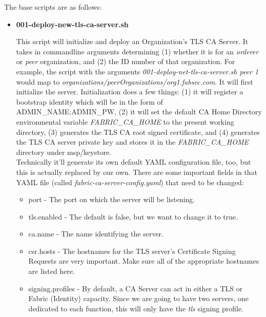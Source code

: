 			The base scripts are as follows:
			\begin{itemize}
				\item \textbf{001-deploy-new-tls-ca-server.sh}
				
					\hspace{10mm}This script will initialize and deploy an Organization's TLS CA Server. It takes in commandline arguments determining (1) whether it is for an \textit{orderer} or \textit{peer} organization, and (2) the ID number of that organization. For example, the script with the arguments \textit{001-deploy-net-tls-ca-server.sh peer 1} would map to \textit{organizations/peerOrganizations/org1.fabsec.com}. It will first initialize the server. Initialization does a few things: (1) it will register a bootstrap identity which will be in the form of ADMIN\_NAME:ADMIN\_PW, (2) it will set the default CA Home Directory environmental variable \textit{FABRIC\_CA\_HOME} to the present working directory, (3) generates the TLS CA root signed certificate, and (4) generates the TLS CA server private key and stores it in the \textit{FABRIC\_CA\_HOME} directory under msp/keystore.\\
					
					\hspace{10mm}Technically it'll generate its own default YAML configuration file, too, but this is actually replaced by our own. There are some important fields in that YAML file (called \textit{fabric-ca-server-config.yaml}) that need to be changed:
						\begin{itemize}
							\item port - The port on which the server will be listening.
							\item tls.enabled - The default is false, but we want to change it to true.
							
							\item ca.name - The name identifying the server.

							\item csr.hosts - The hostnames for the TLS server's Certificate Signing Requests are very important. Make sure all of the appropriate hostnames are listed here.
							
							\item signing.profiles - By default, a CA Server can act in either a TLS or Fabric (Identity) capacity. Since we are going to have two servers, one dedicated to each function, this will only have the \textit{tls} signing profile.
						\end{itemize}
						

\end{itemize}
